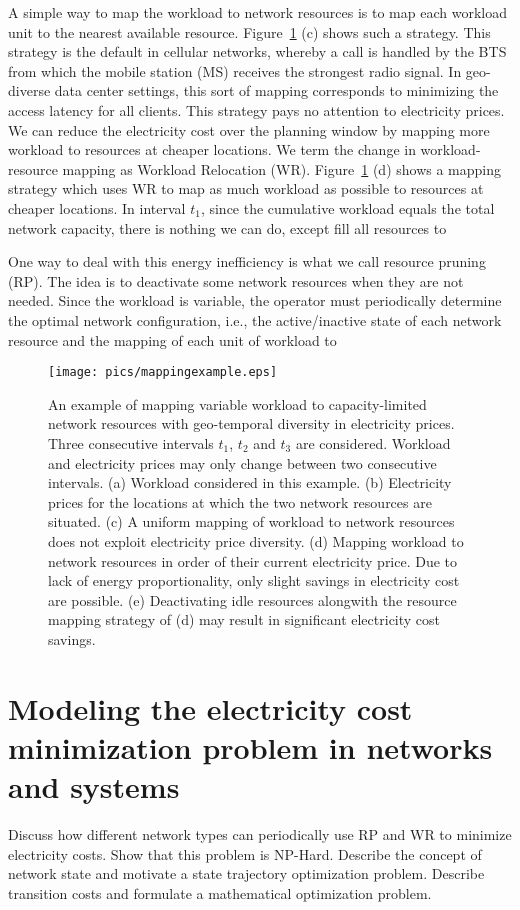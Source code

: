 A simple way to map the workload to network resources is to map each workload unit to the nearest available resource. Figure~\ref{fig:mappingexample} (c) shows such a strategy. This strategy is the default in cellular networks, whereby a call is handled by the BTS from which the mobile station (MS) receives the strongest radio signal. In geo-diverse data center settings, this sort of mapping corresponds to minimizing the access latency for all clients. This strategy pays no attention to electricity prices. We can reduce the electricity cost over the planning window by mapping more workload to resources at cheaper locations. We term the change in workload-resource mapping as Workload Relocation (WR). Figure~\ref{fig:mappingexample} (d) shows a mapping strategy which uses WR to map as much workload as possible to resources at cheaper locations. In interval $t_1$, since the cumulative workload equals the total network capacity, there is nothing we can do, except fill all resources to 

One way to deal with this energy inefficiency is what we call resource pruning (RP). The idea is to deactivate some network resources when they are not needed. Since the workload is variable, the operator must periodically determine the optimal network configuration, i.e., the active/inactive state of each network resource and the mapping of each unit of workload to 

\begin{figure}
\centering
\texttt{[image: pics/mappingexample.eps]}
\caption{An example of mapping variable workload to capacity-limited network resources with geo-temporal diversity in electricity prices. Three consecutive intervals $t_1$, $t_2$ and $t_3$ are considered. Workload and electricity prices may only change between two consecutive intervals. (a) Workload considered in this example. (b) Electricity prices for the locations at which the two network resources are situated. (c) A uniform mapping of workload to network resources does not exploit electricity price diversity. (d) Mapping workload to network resources in order of their current electricity price. Due to lack of energy proportionality, only slight savings in electricity cost are possible. (e) Deactivating idle resources alongwith the resource mapping strategy of (d) may result in significant electricity cost savings.}
\label{fig:mappingexample}
\end{figure}

\section{Modeling the electricity cost minimization problem in networks and systems} Discuss how different network types can periodically use RP and WR to minimize electricity costs. Show that this problem is NP-Hard. Describe the concept of network state and motivate a state trajectory optimization problem. Describe transition costs and formulate a mathematical optimization problem. 

